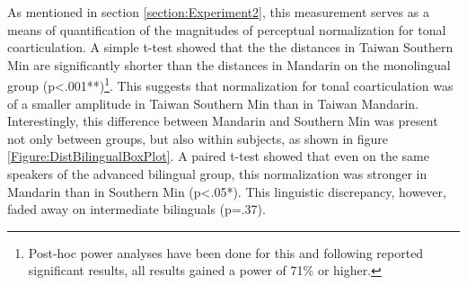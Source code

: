 \documentclass[12pt]{report}
\begin{document}
\begin{CJK}{UTF8}{bsmi}

As mentioned in section \ref{section:Experiment2}, this measurement serves as a means of quantification of the magnitudes of perceptual normalization for tonal coarticulation. A simple t-test showed that the the distances in Taiwan Southern Min are significantly shorter than the distances in Mandarin on the monolingual group (p<.001**)\footnote{Post-hoc power analyses have been done for this and following reported significant results, all results gained a power of 71\% or higher.}. This suggests that normalization for tonal coarticulation was of a smaller amplitude in Taiwan Southern Min than in Taiwan Mandarin. Interestingly, this difference between Mandarin and Southern Min was present not only between groups, but also within subjects, as shown in figure \ref{Figure:DistBilingualBoxPlot}. A paired t-test showed that even on the same speakers of the advanced bilingual group, this normalization was stronger in Mandarin than in Southern Min (p<.05*). This linguistic discrepancy, however, faded away on intermediate bilinguals (p=.37).


\end{CJK}
\end{document}
